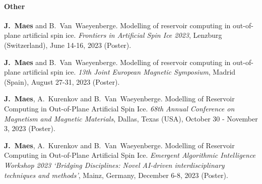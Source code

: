 \paragraph*{Other}
\begin{itemize}
    \textbf{J.~Maes} and B.~Van~Waeyenberge.
    \newblock Modelling of reservoir computing in out-of-plane artificial spin ice.
    \newblock \emph{Frontiers in Artificial Spin Ice 2023}, Lenzburg (Switzerland), June 14-16, 2023 (Poster).

    \textbf{J.~Maes} and B.~Van~Waeyenberge.
    \newblock Modelling of reservoir computing in out-of-plane artificial spin ice.
    \newblock \emph{13th Joint European Magnetic Symposium}, Madrid (Spain), August 27-31, 2023 (Poster).

    \textbf{J.~Maes}, A.~Kurenkov and B.~Van~Waeyenberge.
    \newblock Modelling of Reservoir Computing in Out-of-Plane Artificial Spin Ice.
    \newblock \emph{68th Annual Conference on Magnetism and Magnetic Materials}, Dallas, Texas (USA), October 30 - November 3, 2023 (Poster).

    \textbf{J.~Maes}, A.~Kurenkov and B.~Van~Waeyenberge.
    \newblock Modelling of Reservoir Computing in Out-of-Plane Artificial Spin Ice.
    \newblock \emph{Emergent Algorithmic Intelligence Workshop 2023 `Bridging Disciplines: Novel AI-driven interdisciplinary techniques and methods'}, Mainz, Germany, December 6-8, 2023 (Poster).
\end{itemize}
